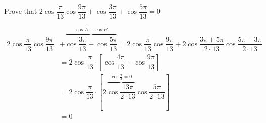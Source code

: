 
%
%
%
%
% 
% 

\question Prove that $2\cos\dfrac{\pi}{13}\cos\dfrac{9\pi}{13} + \cos\dfrac{3\pi}{13} + \cos\dfrac{5\pi}{13} = 0$

\insertQR{}

\ifprintanswers
\fi 

\begin{solution}
   \begin{fullwidth}
     \begin{align}
        2\cos\dfrac{\pi}{13}\cos\dfrac{9\pi}{13} &+ \overbrace{\cos\dfrac{3\pi}{13} + \cos\dfrac{5\pi}{13}}^{\cos A + \cos B}
        = 2\cos\dfrac{\pi}{13}\cos\dfrac{9\pi}{13} + 
        2\cos\dfrac{3\pi + 5\pi}{2\cdot 13}\cos\dfrac{5\pi-3\pi}{2\cdot 13} \\
        &= 2\cos\dfrac{\pi}{13}\cdot\left[ \cos\dfrac{4\pi}{13} + \cos\dfrac{9\pi}{13} \right] \\
        &= 2\cos\dfrac{\pi}{13}\cdot\left[ 2\overbrace{\cos\dfrac{13\pi}{2\cdot 13}}^{\cos\frac{\pi}{2} = 0}\cos\dfrac{5\pi}{2\cdot 13}\right] \\
        &= 0
     \end{align}
   \end{fullwidth}
\end{solution}
